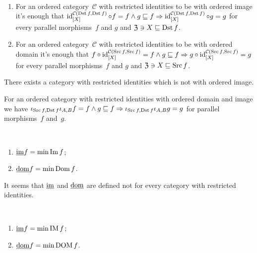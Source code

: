 \begin{obvious}
~
\begin{enumerate}
\item For an ordered category~$\mathcal{C}$ with restricted identities
to be with ordered image it's enough that
$\operatorname{id}^{\mathcal{C}(\operatorname{Dst} f,\operatorname{Dst} f)}_{[X]}\circ f=f\land
g\sqsubseteq f\Rightarrow
\operatorname{id}^{\mathcal{C}(\operatorname{Dst} f,\operatorname{Dst} f)}_{[X]}\circ g=g$
for every parallel morphisms~$f$ and $g$ and
$\mathfrak{Z}\ni X\sqsubseteq\operatorname{Dst} f$.
\item For an ordered category~$\mathcal{C}$ with restricted identities
to be with ordered domain it's enough that
$f\circ\operatorname{id}^{\mathcal{C}(\operatorname{Src} f,\operatorname{Src} f)}_{[X]}=f\land
g\sqsubseteq f\Rightarrow
g\circ\operatorname{id}^{\mathcal{C}(\operatorname{Src} f,\operatorname{Src} f)}_{[X]}=g$
for every parallel morphisms~$f$ and $g$ and
$\mathfrak{Z}\ni X\sqsubseteq\operatorname{Src} f$.
\end{enumerate}
\end{obvious}

\begin{conjecture}
There exists a category with restricted identities which
is not with ordered image.
\end{conjecture}

\begin{obvious}
For an ordered category with restricted identities with
ordered domain and image we have
$\iota_{\operatorname{Src} f,\operatorname{Dst} f}\iota_{A,B}f=f\land g\sqsubseteq f
\Rightarrow
\iota_{\operatorname{Src} f,\operatorname{Dst} f}\iota_{A,B}g=g$
for parallel morphisms~$f$ and~$g$.
\end{obvious}

\begin{defn}
~
\begin{enumerate}
\item $\underline{\operatorname{im}}f = \min\operatorname{Im} f$;
\item $\underline{\operatorname{dom}}f = \min\operatorname{Dom} f$.
\end{enumerate}
\end{defn}

\begin{note}
It seems that $\underline{\operatorname{im}}$ and $\underline{\operatorname{dom}}$ are defined not for every
category with restricted identities.
\end{note}

\begin{prop}
~
\begin{enumerate}
\item $\underline{\operatorname{im}}f = \min\operatorname{IM} f$;
\item $\underline{\operatorname{dom}}f = \min\operatorname{DOM} f$.
\end{enumerate}
\end{prop}

